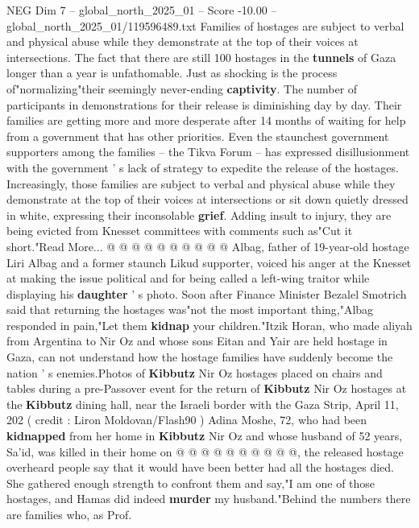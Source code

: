 \begin{textsample}{NEG Dim 7 – global\_north\_2025\_01 – Score -10.00 – global\_north\_2025\_01/119596489.txt}  \label{ex:f7_neg_059}
Families of hostages are subject to verbal and physical abuse while they demonstrate at the top of their voices at intersections.
The fact that there are still 100 hostages in the \textbf{tunnels} of Gaza longer than a year is unfathomable.
Just as shocking is the process of"normalizing"their seemingly never-ending \textbf{captivity}.
The number of participants in demonstrations for their release is diminishing day by day.
Their families are getting more and more desperate after 14 months of waiting for help from a government that has other priorities.
Even the staunchest government supporters among the families -- the Tikva Forum -- has expressed disillusionment with the government ' s lack of strategy to expedite the release of the hostages.
Increasingly, those families are subject to verbal and physical abuse while they demonstrate at the top of their voices at intersections or sit down quietly dressed in white, expressing their inconsolable \textbf{grief}.
Adding insult to injury, they are being evicted from Knesset committees with comments such as"Cut it short."Read More... @ @ @ @ @ @ @ @ @ @ Albag, father of 19-year-old hostage Liri Albag and a former staunch Likud supporter, voiced his anger at the Knesset at making the issue political and for being called a left-wing traitor while displaying his \textbf{daughter} ' s photo.
Soon after Finance Minister Bezalel Smotrich said that returning the hostages was"not the most important thing,"Albag responded in pain,"Let them \textbf{kidnap} your children."Itzik Horan, who made aliyah from Argentina to Nir Oz and whose sons Eitan and Yair are held hostage in Gaza, can not understand how the hostage families have suddenly become the nation ' s enemies.Photos of \textbf{Kibbutz} Nir Oz hostages placed on chairs and tables during a pre-Passover event for the return of \textbf{Kibbutz} Nir Oz hostages at the \textbf{Kibbutz} dining hall, near the Israeli border with the Gaza Strip, April 11, 202 ( credit : Liron Moldovan/Flash90 ) Adina Moshe, 72, who had been \textbf{kidnapped} from her home in \textbf{Kibbutz} Nir Oz and whose husband of 52 years, Sa'id, was killed in their home on @ @ @ @ @ @ @ @ @ @, the released hostage overheard people say that it would have been better had all the hostages died.
She gathered enough strength to confront them and say,"I am one of those hostages, and Hamas did indeed \textbf{murder} my husband."Behind the numbers there are families who, as Prof.

\end{textsample}
